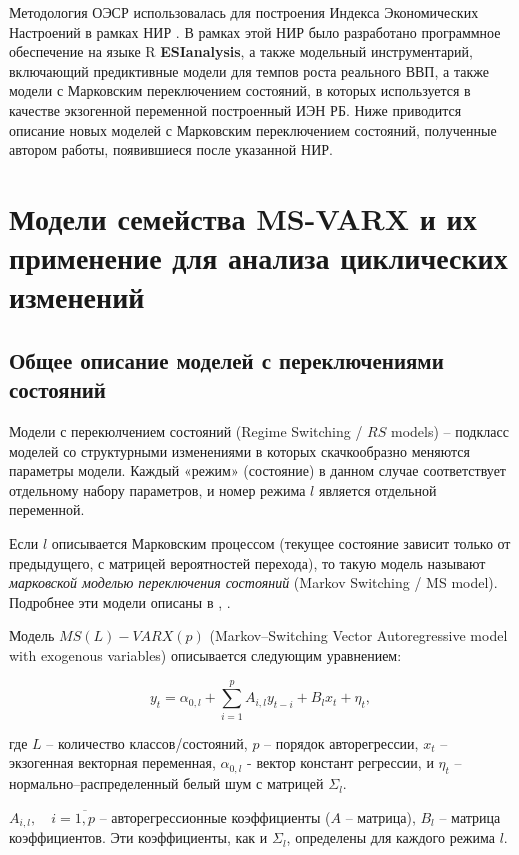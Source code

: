 \documentclass[../report.tex]{subfiles}
\begin{document}
	Методология ОЭСР использовалась для построения Индекса Экономических Настроений в рамках НИР \cite{esiMaking}. В рамках этой НИР было разработано программное обеспечение на языке R \textbf{ESIanalysis}, а также модельный инструментарий, включающий предиктивные модели для темпов роста реального ВВП, а также модели с Марковским переключением состояний, в которых используется в качестве экзогенной переменной построенный ИЭН РБ. Ниже приводится описание новых моделей с Марковским переключением состояний, полученные автором работы, появившиеся после указанной НИР.
	
	
	\section{Модели семейства MS-VARX и их применение для анализа циклических изменений}
	
	\subsection{Общее описание моделей с переключениями состояний}
	Модели с перекюлчением состояний (Regime Switching / $RS$ models) – подкласс моделей со структурными изменениями в которых скачкообразно меняются параметры модели. Каждый «режим» (состояние) в данном случае соответствует отдельному набору параметров, и номер режима $l$ является отдельной переменной.
	
	Если $l$ описывается Марковским процессом (текущее состояние зависит только от предыдущего, с матрицей вероятностей перехода), то такую модель называют \textit{марковской моделью переключения состояний} (Markov Switching / MS model). Подробнее эти модели описаны в \cite{malNovopMSVARX}, \cite{mal_methods_nonconstant}.
	
	Модель $MS(L)-VARX(p)$ (Markov–Switching Vector Autoregressive model with exogenous variables) описывается следующим уравнением:
	
	\begin{equation}
	y_{t} = \alpha_{0,l} + \sum_{i=1}^{p} A_{i,l} y_{t-i} + B_{l} x_{t} + \eta_{t},
	\end{equation}
	
	где $L$ – количество классов/состояний, $p$ – порядок авторегрессии, $x_{t}$ – экзогенная векторная переменная, $\alpha_{0,l}$ - вектор констант регрессии, и $\eta_{t}$ – нормально–распределенный белый шум с матрицей $\Sigma_{l}$.
	
	$A_{i,l}, \quad i = \overline{1,p} $ – авторегрессионные коэффициенты ($A$ – матрица), $B_{l}$ – матрица коэффициентов. Эти коэффициенты, как и $\Sigma_{l}$, определены для каждого режима $l$.
	
\end{document}
